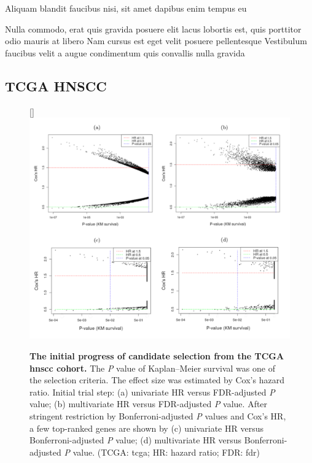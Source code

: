 \documentclass[
paper=landscape,
paper=160mm:90mm, %
fontsize=11pt, %
pagesize, %
parskip=half-, %
]{scrartcl} %
\newcommand{\bcaption}[2]{\caption{\textbf{#1} #2}}
\theoremstyle{mythmstyle} %
\begin{document}
\begin{outline}

\1 Aliquam blandit faucibus nisi, sit amet dapibus enim tempus eu

\2 Nulla commodo, erat quis gravida posuere
\1 elit lacus lobortis est, quis porttitor odio mauris at libero
\1 Nam cursus est eget velit posuere pellentesque
\1 Vestibulum faucibus velit a augue condimentum quis convallis nulla gravida

\end{outline}


\clearpage
\subsection{TCGA HNSCC}

\begin{figure}[hbt!]
\centering
{}[\FBwidth]
{\includegraphics[width =\textwidth, height = 0.6\textheight, keepaspectratio]{Figure2.pdf}}
{\bcaption{The initial progress of candidate selection from the TCGA \acrshort{hnscc} cohort.}{The \protect\textit{P} value of Kaplan--Meier survival was one of the selection criteria.
The effect size was estimated by Cox's hazard ratio.
Initial trial step: (a) univariate HR versus FDR-adjusted \protect\textit{P} value; (b) multivariate HR versus FDR-adjusted \protect\textit{P} value.
After stringent restriction by Bonferroni-adjusted \protect\textit{P} values and Cox's HR, a few top-ranked genes are shown by
(c) univariate HR versus Bonferroni-adjusted \protect\textit{P} value;  (d) multivariate HR versus Bonferroni-adjusted \protect\textit{P} value.
(TCGA: \acrlong{tcga}; HR: hazard ratio; FDR: \acrlong{fdr})}}
\end{figure}
\end{document}
